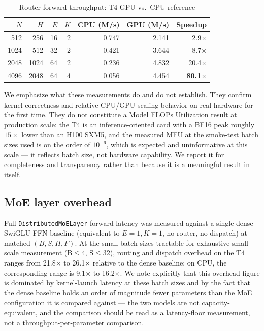 \documentclass[11pt]{article}
\begin{document}
\begin{table}[h]
\centering
\small
\caption{Router forward throughput: T4 GPU vs.\ CPU reference}
\label{tab:speedup}
\begin{tabular}{@{}rrrrrrr@{}}
\toprule
$N$ & $H$ & $E$ & $K$ & CPU (M/s) & GPU (M/s) & Speedup \\
\midrule
512  & 256  & 16 & 2 & 0.747 & 2.141 & 2.9$\times$ \\
1024 & 512  & 32 & 2 & 0.421 & 3.644 & 8.7$\times$ \\
2048 & 1024 & 64 & 2 & 0.236 & 4.832 & 20.4$\times$ \\
4096 & 2048 & 64 & 4 & 0.056 & 4.454 & \textbf{80.1$\times$} \\
\bottomrule
\end{tabular}
\end{table}

We emphasize what these measurements do and do not establish. They confirm
kernel correctness and relative CPU/GPU scaling behavior on real hardware
for the first time. They do not constitute a Model FLOPs Utilization
result at production scale: the T4 is an inference-oriented card with a
BF16 peak roughly $15\times$ lower than an H100 SXM5, and the measured MFU
at the smoke-test batch sizes used is on the order of $10^{-6}$, which is
expected and uninformative at this scale --- it reflects batch size, not
hardware capability. We report it for completeness and transparency rather
than because it is a meaningful result in itself.

\subsection{MoE layer overhead}

Full \texttt{DistributedMoELayer} forward latency was measured against a
single dense SwiGLU FFN baseline (equivalent to $E{=}1, K{=}1$, no router,
no dispatch) at matched $(B, S, H, F)$. At the small batch sizes tractable
for exhaustive small-scale measurement (B$\le$4, S$\le$32), routing and
dispatch overhead on the T4 ranges from 21.8$\times$ to 26.1$\times$
relative to the dense baseline; on CPU, the corresponding range is
9.1$\times$ to 16.2$\times$. We note explicitly that this overhead figure
is dominated by kernel-launch latency at these batch sizes and by the fact
that the dense baseline holds an order of magnitude fewer parameters than
the MoE configuration it is compared against --- the two models are not
capacity-equivalent, and the comparison should be read as a latency-floor
measurement, not a throughput-per-parameter comparison.
\end{document}
